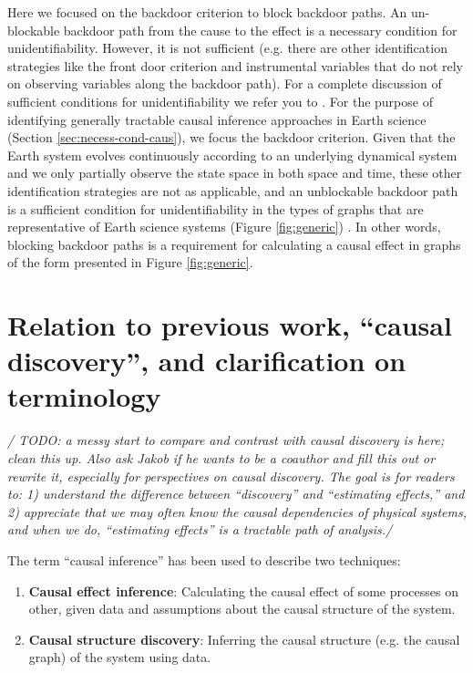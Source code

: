 \documentclass[12pt]{article}
\begin{document}
Here we focused on the backdoor criterion to block backdoor paths. An
un-blockable backdoor path from the cause to the effect is a necessary
condition for unidentifiability. However, it is not sufficient
(e.g. there are other identification strategies like the front door
criterion and instrumental variables that do not rely on observing
variables along the backdoor path). For a complete discussion of
sufficient conditions for unidentifiability we refer you to
\citet{shpitser2006}. For the purpose of identifying generally
tractable causal inference approaches in Earth science (Section
\ref{sec:necess-cond-caus}), we focus the backdoor criterion. Given
that the Earth system evolves continuously according to an underlying
dynamical system and we only partially observe the state space in both
space and time, these other identification strategies are not as
applicable, and an unblockable backdoor path is a sufficient condition
for unidentifiability in the types of graphs that are representative
of Earth science systems (Figure \ref{fig:generic})
\citep{tian2002general}. In other words, blocking backdoor paths is a
requirement for calculating a causal effect in graphs of the form
presented in Figure \ref{fig:generic}.

\section{Relation to previous work, ``causal discovery'', and
  clarification on terminology}
\label{sec:discovery}


\textit{/ TODO: a messy start to compare and contrast with causal
  discovery is here; clean this up. Also ask Jakob if he wants to be a
  coauthor and fill this out or rewrite it, especially for
  perspectives on causal discovery. The goal is for readers to: 1)
  understand the difference between ``discovery'' and ``estimating
  effects,'' and 2) appreciate that we may often know the causal
  dependencies of physical systems, and when we do, ``estimating
  effects'' is a tractable path of analysis./}

The term ``causal inference'' has been used to describe two
techniques:

\begin{enumerate}
\item \textbf{Causal effect inference}: Calculating the causal effect
  of some processes on other, given data and assumptions about the
  causal structure of the system.
\item \textbf{Causal structure discovery}: Inferring the causal
  structure (e.g. the causal graph) of the system using data.
\end{enumerate}
\end{document}
